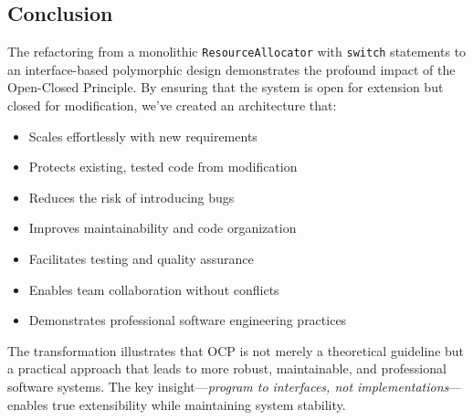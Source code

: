 \subsection{Conclusion}

The refactoring from a monolithic \texttt{ResourceAllocator} with \texttt{switch} statements to an interface-based polymorphic design demonstrates the profound impact of the Open-Closed Principle. By ensuring that the system is open for extension but closed for modification, we've created an architecture that:

\begin{itemize}
    \item Scales effortlessly with new requirements
    \item Protects existing, tested code from modification
    \item Reduces the risk of introducing bugs
    \item Improves maintainability and code organization
    \item Facilitates testing and quality assurance
    \item Enables team collaboration without conflicts
    \item Demonstrates professional software engineering practices
\end{itemize}

The transformation illustrates that OCP is not merely a theoretical guideline but a practical approach that leads to more robust, maintainable, and professional software systems. The key insight—\textit{program to interfaces, not implementations}—enables true extensibility while maintaining system stability.
